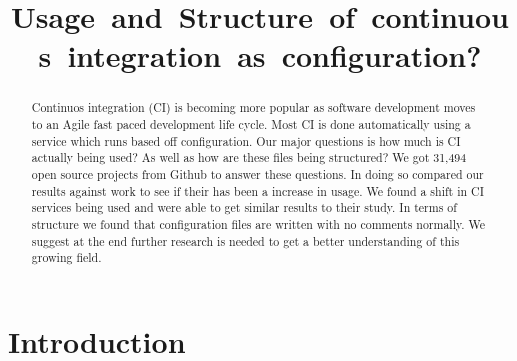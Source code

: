 \documentclass[10pt,conference]{IEEEtran}
\begin{document}
\title{Usage and Structure of continuous integration as configuration?}

\author{
\and
{}
\and
{}
}

\maketitle           %


\begin{abstract}
  Continuos integration (CI) is becoming more popular as software development moves to an Agile fast paced development life cycle. Most CI is done automatically using a service which runs based off configuration. Our major questions is how much is CI actually being used? As well as how are these files being structured? We got 31,494 open source projects from Github to answer these questions. In doing so compared our results against \citet{Hilton2016} work to see if their has been a increase in usage. We found a shift in CI services being used and were able to get similar results to their study. In terms of structure we found that configuration files are written with no comments normally. We suggest at the end further research is needed to get a better understanding of this growing field.    
\end{abstract}

\section{Introduction}
\label{Introduction}
\end{document}

